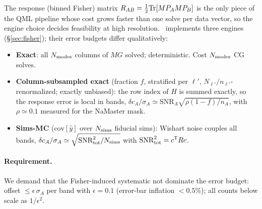 
The response (binned Fisher) matrix $R_{AB}=\frac12\mathrm{Tr}[MP_AMP_B]$ is the
only piece of the QML pipeline whose cost grows faster than one solve per
data vector, so the engine choice decides feasibility at high resolution.
\simaster\ implements three engines (\S\ref{sec:fisher}); their error
budgets differ qualitatively:

\begin{itemize}
\item \textbf{Exact}: all $N_{\rm modes}$ columns of $MG$ solved;
  deterministic. Cost $N_{\rm modes}$ CG solves.
\item \textbf{Column-subsampled exact} (fraction $f$, stratified per
  $\ell'$, $N_{\ell'}/n_{\ell'}$-renormalized; exactly unbiased): the
  row index of $H$ is summed exactly, so the response error is local in
  bands, $\delta c_A/\sigma_A \simeq \mathrm{SNR}_A
  \sqrt{\rho(1-f)/n_A}$, with $\rho\simeq0.1$ measured for the
  NaMaster mask.
\item \textbf{Sims-MC} ($\mathrm{cov}[\hat y]$ over $N_{\rm sims}$
  fiducial sims): Wishart noise couples all bands,
  $\delta c_A/\sigma_A \simeq \sqrt{\mathrm{SNR}^2_{\rm tot}/
  N_{\rm sims}}$ with $\mathrm{SNR}^2_{\rm tot}=c^{\sf T}Rc$.
\end{itemize}

\paragraph{Requirement.} We demand that the Fisher-induced systematic not
dominate the error budget: offset $\le \epsilon\,\sigma_A$ per band with
$\epsilon=0.1$ (error-bar inflation $<0.5\%$); all counts below scale as
$1/\epsilon^2$.

